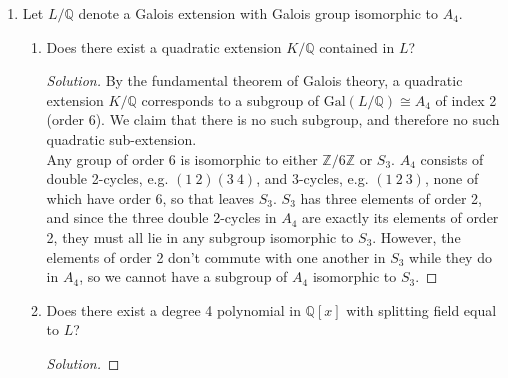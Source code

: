 \documentclass[11pt,letterpaper]{report}
\newcommand{\integers}{\mathbb{Z}}
\newcommand{\rationals}{\mathbb{Q}}
\newcommand{\Gal}{\text{Gal}}
\newenvironment{solution}
{\begin{proof}[Solution]}
{\end{proof}}
\begin{document}
\begin{enumerate}
\begin{enumerate}
\begin{solution}
			\noindent We start by showing that $\rationals(2^{5/6}) = \rationals(2^{1/6})$. Clearly $\rationals(2^{5/6})\subseteq \rationals(2^{1/6})$. On the other hand, $\frac{1}{2^4}(2^{5/6})^5 = 2^{1/6}$, so $\rationals(2^{1/6})\subseteq \rationals(2^{5/6})$. Finally, $2^{1/6}$ is a root of the polynomial $x^6-2$, which is irreducible over $\rationals$ by Eisenstein, so we have that $2^{1/6}$, and therefore $2^{5/6}$, has degree 6 over $\rationals$.
		\end{solution}
	\end{enumerate}

	\item Let $L/\rationals$ denote a Galois extension with Galois group isomorphic to $A_4$.
	\begin{enumerate}
		\item Does there exist a quadratic extension $K/\rationals$ contained in $L$?
		\begin{solution}
			By the fundamental theorem of Galois theory, a quadratic extension $K/\rationals$ corresponds to a subgroup of $\Gal(L/\rationals)\cong A_4$ of index 2 (order 6). We claim that there is no such subgroup, and therefore no such quadratic sub-extension.\\

			\noindent Any group of order 6 is isomorphic to either $\integers/6\integers$ or $S_3$. $A_4$ consists of double 2-cycles, e.g. $(1\ 2)(3\ 4)$, and 3-cycles, e.g. $(1\ 2\ 3)$, none of which have order 6, so that leaves $S_3$. $S_3$ has three elements of order 2, and since the three double 2-cycles in $A_4$ are exactly its elements of order 2, they must all lie in any subgroup isomorphic to $S_3$. However, the elements of order 2 don't commute with one another in $S_3$ while they do in $A_4$, so we cannot have a subgroup of $A_4$ isomorphic to $S_3$.
		\end{solution}
		\item Does there exist a degree 4 polynomial in $\rationals[x]$ with splitting field equal to $L$?
		\begin{solution}
			

\end{solution}
\end{enumerate}
\end{enumerate}
\end{document}
